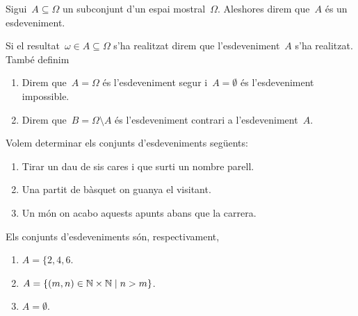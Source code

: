 \documentclass[../Apunts.tex]{subfiles}
\begin{document}
	\begin{definition}[Esdeveniment]
		\label{def:esdeveniment}
		\label{def:esdeveniment segur}
		\label{def:esdeveniment contrari}
		\label{def:esdeveniment impossible}
		Sigui~\(A\subseteq\Omega\) un subconjunt d'un espai mostral~\(\Omega\). Aleshores direm que~\(A\) és un esdeveniment.
		
		Si el resultat~\(\omega\in A\subseteq\Omega\) s'ha realitzat direm que l'esdeveniment~\(A\) s'ha realitzat. També definim
		\begin{enumerate}
			\item Direm que~\(A=\Omega\) és l'esdeveniment segur i~\(A=\emptyset\) és l'esdeveniment impossible.
			\item Direm que~\(B=\Omega\setminus A\) és l'esdeveniment contrari a l'esdeveniment~\(A\).
		\end{enumerate}
	\end{definition}
	\begin{example}
		Volem determinar els conjunts d'esdeveniments següents:
		\begin{enumerate}
			\item Tirar un dau de sis cares i que surti un nombre parell.
			\item Una partit de bàsquet on guanya el visitant.
			\item Un món on acabo aquests apunts abans que la carrera.
		\end{enumerate}
		\begin{solution}
			Els conjunts d'esdeveniments són, respectivament,
			\begin{enumerate}
				\item \(A=\{2,4,6\).
				\item \(A=\{(m,n)\in\mathbb{N}\times\mathbb{N}\mid n>m\}\).
				\item \(A=\emptyset\).\qedhere
			\end{enumerate}
		\end{solution}
	\end{example}
\end{document}
